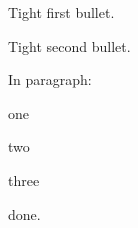 \documentclass{article}
\begin{document}
\begin{compactitem}
\item Tight first bullet.
\item Tight second bullet.
\end{compactitem}
In paragraph: \begin{inparaenum}[(a)]\item one\item two\item three\end{inparaenum} done.
\end{document}

